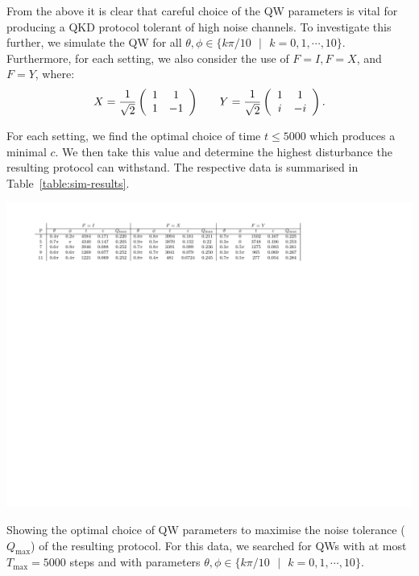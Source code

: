 From the above it is clear that careful choice of the QW parameters is vital for producing a QKD protocol tolerant of high noise channels.  To investigate this further, we simulate the QW for all $\theta,\phi \in \{k\pi/10 \text{ } | \text{ } k = 0, 1, \cdots, 10\}$.  Furthermore, for each setting, we also consider the use of $F = I, F = X$, and $F = Y$, where:
\[
\begin{array}{clc}
X = \displaystyle \frac{1}{\sqrt{2}}\left(
			\begin{array}{cc}
					1 & 1\\
					1 & -1
			\end{array}\right)
& &
Y = \displaystyle \frac{1}{\sqrt{2}}\left(
			\begin{array}{cc}
					1 & 1\\
					i & -i
			\end{array}\right).
\end{array}
\]	


For each setting, we find the optimal choice of time $t \le 5000$ which produces a minimal $c$.  We then take this value and determine the highest disturbance the resulting protocol can withstand.  The respective data is summarised in Table~\ref{table:sim-results}.

\begin{center}
	\begin{table}[h!]
		\includegraphics[scale = 1.1]{Table1}
		\caption{Showing the optimal choice of QW parameters to maximise the noise tolerance ($Q_{\text{max}}$) of the resulting protocol.  For this data, we searched for QWs with at most $T_{\text{max}} = 5000$ steps and with parameters $\theta,\phi \in \{k\pi/10 \text{ } | \text{ } k = 0, 1, \cdots, 10\}$.}\label{table:sim-results}
	\end{table}
\end{center}

